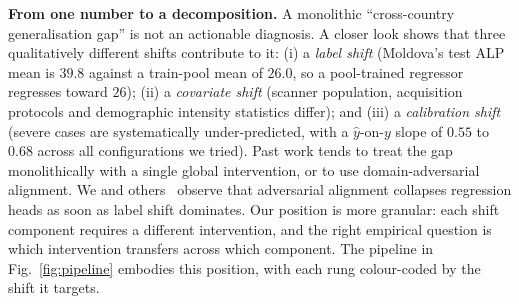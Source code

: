\documentclass[runningheads]{llncs}
\begin{document}
\smallskip\noindent\textbf{From one number to a decomposition.}
A monolithic ``cross-country generalisation gap'' is not an actionable diagnosis. A closer look shows that three qualitatively different shifts contribute to it: (i) a \emph{label shift} (Moldova's test ALP mean is $39.8$ against a train-pool mean of $26.0$, so a pool-trained regressor regresses toward $26$); (ii) a \emph{covariate shift} (scanner population, acquisition protocols and demographic intensity statistics differ); and (iii) a \emph{calibration shift} (severe cases are systematically under-predicted, with a $\hat{y}$-on-$y$ slope of $0.55$ to $0.68$ across all configurations we tried). Past work tends to treat the gap monolithically with a single global intervention, or to use domain-adversarial alignment. We and others~\cite{gulrajani2021domainbed} observe that adversarial alignment collapses regression heads as soon as label shift dominates. Our position is more granular: each shift component requires a different intervention, and the right empirical question is which intervention transfers across which component. The pipeline in Fig.~\ref{fig:pipeline} embodies this position, with each rung colour-coded by the shift it targets.
\end{document}
